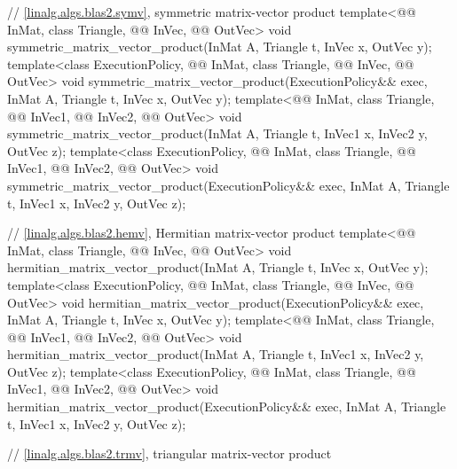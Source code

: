 \begin{codeblock}
{  // \ref{linalg.algs.blas2.symv}, symmetric matrix-vector product
  template<@@ InMat, class Triangle, @@ InVec, @@ OutVec>
    void symmetric_matrix_vector_product(InMat A, Triangle t, InVec x, OutVec y);
  template<class ExecutionPolicy,
           @@ InMat, class Triangle, @@ InVec, @@ OutVec>
    void symmetric_matrix_vector_product(ExecutionPolicy&& exec,
                                         InMat A, Triangle t, InVec x, OutVec y);
  template<@@ InMat, class Triangle, @@ InVec1, @@ InVec2,
           @@ OutVec>
    void symmetric_matrix_vector_product(InMat A, Triangle t, InVec1 x, InVec2 y, OutVec z);
  template<class ExecutionPolicy,
           @@ InMat, class Triangle, @@ InVec1, @@ InVec2,
           @@ OutVec>
    void symmetric_matrix_vector_product(ExecutionPolicy&& exec,
                                         InMat A, Triangle t, InVec1 x, InVec2 y, OutVec z);

  // \ref{linalg.algs.blas2.hemv}, Hermitian matrix-vector product
  template<@@ InMat, class Triangle, @@ InVec, @@ OutVec>
    void hermitian_matrix_vector_product(InMat A, Triangle t, InVec x, OutVec y);
  template<class ExecutionPolicy,
           @@ InMat, class Triangle, @@ InVec, @@ OutVec>
    void hermitian_matrix_vector_product(ExecutionPolicy&& exec,
                                         InMat A, Triangle t, InVec x, OutVec y);
  template<@@ InMat, class Triangle, @@ InVec1, @@ InVec2,
           @@ OutVec>
    void hermitian_matrix_vector_product(InMat A, Triangle t, InVec1 x, InVec2 y, OutVec z);
  template<class ExecutionPolicy,
           @@ InMat, class Triangle, @@ InVec1, @@ InVec2,
           @@ OutVec>
    void hermitian_matrix_vector_product(ExecutionPolicy&& exec,
                                         InMat A, Triangle t, InVec1 x, InVec2 y, OutVec z);

  // \ref{linalg.algs.blas2.trmv}, triangular matrix-vector product

}
\end{codeblock}
